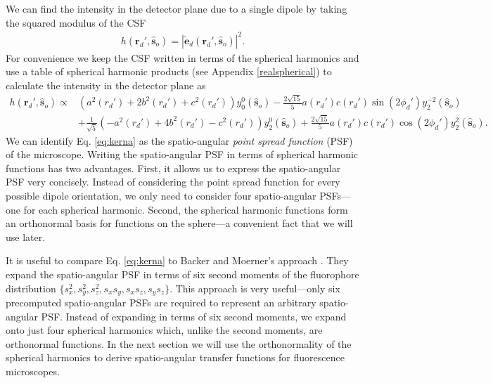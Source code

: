 \documentclass[11pt]{article}
\providecommand{\mb}[1]{\mathbf{#1}}
\providecommand{\so}[1]{\mathbf{\hat{s}}_o}
\providecommand{\rd}[1]{\mathbf{r}_d}
\begin{document}
We can find the intensity in the detector plane due to a single dipole
by taking the squared modulus of the CSF
\begin{align}
  h(\rd{}', \so{}) = \left|\tilde{\mb{e}}_d(\rd{}', \so{})\right|^2 \label{eq:kernel}.
\end{align}
For convenience we keep the CSF written in terms of the spherical harmonics and
use a table of spherical harmonic products (see Appendix \ref{realspherical}) to
calculate the intensity in the detector plane as
\begin{equation}
  \begin{split}
  h(\rd{}', \so{}) \propto &\left(a^2(r_d') + 2b^2(r_d') + c^2(r_d')\right)y_0^0(\so{}) -\frac{2\sqrt{15}}{5}a(r_d')c(r_d')\sin(2\phi_d')y_2^{-2}(\so{})\\ &+ \frac{1}{\sqrt{5}}\left(-a^2(r_d') + 4b^2(r_d') - c^2(r_d')\right)y_2^{0}(\so{}) +\frac{2\sqrt{15}}{5}a(r_d')c(r_d')\cos(2\phi_d')y_2^{2}(\so{}). \label{eq:kerna}
\end{split}
\end{equation}
We can identify Eq. \ref{eq:kerna} as the spatio-angular \textit{point spread
  function} (PSF) of the microscope. Writing the spatio-angular PSF in terms of
spherical harmonic functions has two advantages. First, it allows us to express
the spatio-angular PSF very concisely. Instead of considering the point spread
function for every possible dipole orientation, we only need to consider four
spatio-angular PSFs---one for each spherical harmonic. Second, the spherical
harmonic functions form an orthonormal basis for functions on the sphere---a
convenient fact that we will use later.

It is useful to compare Eq. \ref{eq:kerna} to Backer and Moerner's approach
\cite{backer2014}. They expand the spatio-angular PSF in terms of six second
moments of the fluorophore distribution
$\{s_x^2, s_y^2, s_z^2, s_xs_y, s_xs_z, s_ys_z\}$. This approach is very
useful---only six precomputed spatio-angular PSFs are required to represent an
arbitrary spatio-angular PSF. Instead of expanding in terms of six second
moments, we expand onto just four spherical harmonics which, unlike the second
moments, are orthonormal functions. In the next section we will use the
orthonormality of the spherical harmonics to derive spatio-angular transfer
functions for fluorescence microscopes.
\end{document}

